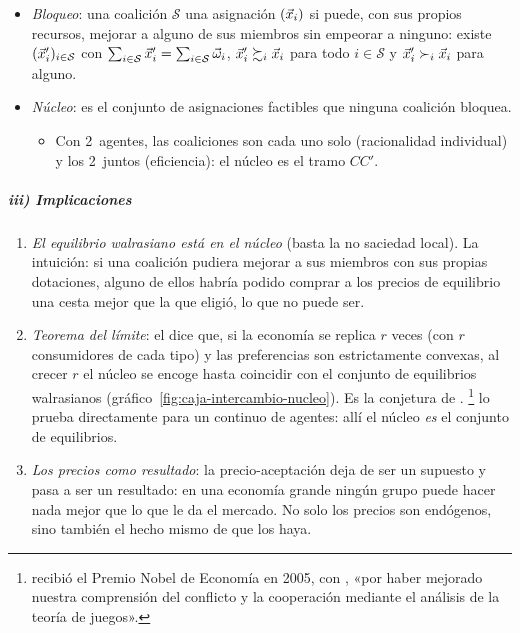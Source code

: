 \documentclass[11pt]{article}
\begin{document}
\begin{itemize}
\item \emph{Bloqueo}: una coalición $\mathcal{S}$  una asignación $(\vec{x}_i)$ si puede, con sus propios recursos, mejorar a alguno de sus miembros sin empeorar a ninguno: existe $(\vec{x}'_i)_{i\in\mathcal{S}}$ con $\sum_{i\in\mathcal{S}}\vec{x}'_i=\sum_{i\in\mathcal{S}}\vec{\omega}_i$, $\vec{x}'_i\succsim_i\vec{x}_i$ para todo $i\in\mathcal{S}$ y $\vec{x}'_i\succ_i\vec{x}_i$ para alguno.
\item \emph{Núcleo}: es el conjunto de asignaciones factibles que ninguna coalición bloquea.
  \begin{itemize}
  \item Con 2~agentes, las coaliciones son cada uno solo (racionalidad individual) y los 2~juntos (eficiencia): el núcleo es el tramo $CC'$.
  \end{itemize}
\end{itemize}

\subparagraph{iii) Implicaciones}

\begin{enumerate}
\item \emph{El equilibrio walrasiano está en el núcleo} (basta la no saciedad local). La intuición: si una coalición pudiera mejorar a sus miembros con sus propias dotaciones, alguno de ellos habría podido comprar a los precios de equilibrio una cesta mejor que la que eligió, lo que no puede ser.
\item \emph{Teorema del límite}: el \nocite{DebreuScarf1963Limit} dice que, si la economía se replica $r$ veces (con $r$ consumidores de cada tipo) y las preferencias son estrictamente convexas, al crecer $r$ el núcleo se encoge hasta coincidir con el conjunto de equilibrios walrasianos (gráfico~\ref{fig:caja-intercambio-nucleo}). Es la conjetura de . \textcite{Aumann1964Markets}\footnote{ recibió el Premio Nobel de Economía en 2005, con , «por haber mejorado nuestra comprensión del conflicto y la cooperación mediante el análisis de la teoría de juegos»\nocite{Nobel2005AumannSchelling}.} lo prueba directamente para un continuo de agentes: allí el núcleo \emph{es} el conjunto de equilibrios.
\item \emph{Los precios como resultado}: la precio-aceptación deja de ser un supuesto y pasa a ser un resultado: en una economía grande ningún grupo puede hacer nada mejor que lo que le da el mercado. No solo los precios son endógenos, sino también el hecho mismo de que los haya.
\end{enumerate}
\end{document}
